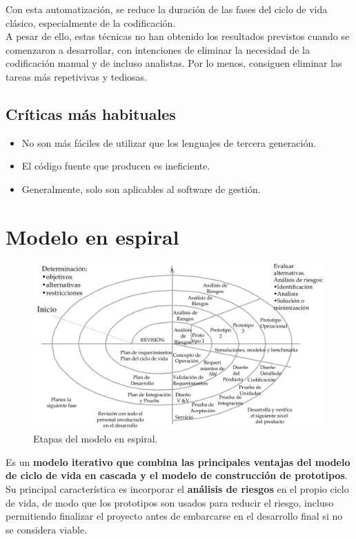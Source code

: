 Con esta automatización, se reduce la duración de las fases del ciclo de vida clásico, especialmente de la codificación.\\

A pesar de ello, estas técnicas no han obtenido los resultados previstos cuando se comenzaron a desarrollar, con intenciones de eliminar la necesidad de la codificación manual y de incluso analistas. Por lo menos, consiguen eliminar las tareas más repetivivas y tediosas.

\subsection{Críticas más habituales}

\begin{itemize}
   \item No son más fáciles de utilizar que los lenguajes de tercera generación.
   \item El código fuente que producen es ineficiente.
   \item Generalmente, solo son aplicables al software de gestión.
\end{itemize}


\section{Modelo en espiral}

\begin{figure}[H]
   \centering
   \includegraphics[width=0.9\linewidth]{Resources/Tema3/modeloEspiral.png}
   \caption{Etapas del modelo en espiral.}
   \label{fig:modeloEspiral}
\end{figure}

Es un \textbf{modelo iterativo que combina las principales ventajas del modelo de ciclo de vida en cascada y el modelo de construcción de prototipos}. Su principal característica es incorporar el \textbf{análisis de riesgos} en el propio ciclo de vida, de modo que los prototipos son usados para reducir el riesgo, incluso permitiendo finalizar el proyecto antes de embarcarse en el desarrollo final si no se considera viable.\\

